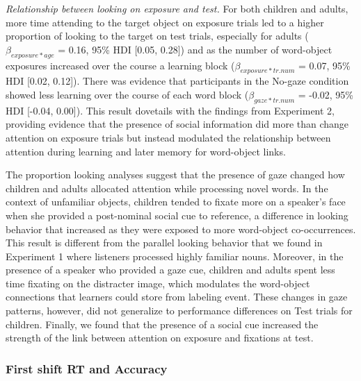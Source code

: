 \documentclass[10pt, letterpaper]{article}
\begin{document}
\emph{Relationship between looking on exposure and test.} For both
children and adults, more time attending to the target object on
exposure trials led to a higher proportion of looking to the target on
test trials, especially for adults (\(\beta_{exposure*age}\) = 0.16,
95\% HDI {[}0.05, 0.28{]}) and as the number of word-object exposures
increased over the course a learning block (\(\beta_{exposure*tr.num}\)
= 0.07, 95\% HDI {[}0.02, 0.12{]}). There was evidence that participants
in the No-gaze condition showed less learning over the course of each
word block (\(\beta_{gaze*tr.num}\) = -0.02, 95\% HDI {[}-0.04,
0.00{]}). This result dovetails with the findings from Experiment 2,
providing evidence that the presence of social information did more than
change attention on exposure trials but instead modulated the
relationship between attention during learning and later memory for
word-object links.

The proportion looking analyses suggest that the presence of gaze
changed how children and adults allocated attention while processing
novel words. In the context of unfamiliar objects, children tended to
fixate more on a speaker's face when she provided a post-nominal social
cue to reference, a difference in looking behavior that increased as
they were exposed to more word-object co-occurrences. This result is
different from the parallel looking behavior that we found in Experiment
1 where listeners processed highly familiar nouns. Moreover, in the
presence of a speaker who provided a gaze cue, children and adults spent
less time fixating on the distracter image, which modulates the
word-object connections that learners could store from labeling event.
These changes in gaze patterns, however, did not generalize to
performance differences on Test trials for children. Finally, we found
that the presence of a social cue increased the strength of the link
between attention on exposure and fixations at test.

\hypertarget{first-shift-rt-and-accuracy-1}{%
\subsubsection{First shift RT and
Accuracy}\label{first-shift-rt-and-accuracy-1}}
\end{document}
